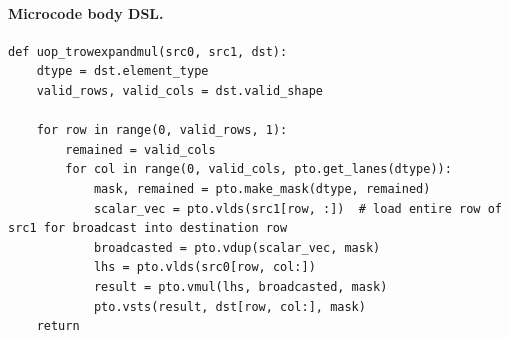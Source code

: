 \paragraph{Microcode body DSL.}
\begin{lstlisting}[style=ptocode]
def uop_trowexpandmul(src0, src1, dst):
    dtype = dst.element_type
    valid_rows, valid_cols = dst.valid_shape

    for row in range(0, valid_rows, 1):
        remained = valid_cols
        for col in range(0, valid_cols, pto.get_lanes(dtype)):
            mask, remained = pto.make_mask(dtype, remained)
            scalar_vec = pto.vlds(src1[row, :])  # load entire row of src1 for broadcast into destination row
            broadcasted = pto.vdup(scalar_vec, mask)
            lhs = pto.vlds(src0[row, col:])
            result = pto.vmul(lhs, broadcasted, mask)
            pto.vsts(result, dst[row, col:], mask)
    return
\end{lstlisting}
\Needspace{0.34\textheight}
